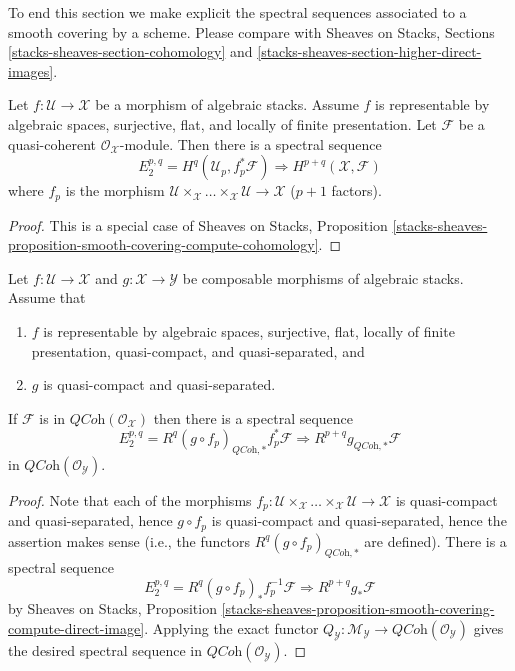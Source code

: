 \noindent
To end this section we make explicit the spectral sequences
associated to a smooth covering by a scheme. Please compare with
Sheaves on Stacks, Sections \ref{stacks-sheaves-section-cohomology} and
\ref{stacks-sheaves-section-higher-direct-images}.

\begin{proposition}
\label{proposition-smooth-covering-compute-cohomology}
Let $f : \mathcal{U} \to \mathcal{X}$ be a morphism of algebraic stacks.
Assume $f$ is representable by algebraic spaces, surjective, flat, and
locally of finite presentation. Let $\mathcal{F}$ be a quasi-coherent
$\mathcal{O}_\mathcal{X}$-module. Then there is a spectral sequence
$$
E_2^{p, q} = H^q(\mathcal{U}_p, f_p^*\mathcal{F})
\Rightarrow
H^{p + q}(\mathcal{X}, \mathcal{F})
$$
where $f_p$ is the morphism
$\mathcal{U} \times_\mathcal{X} \ldots \times_\mathcal{X} \mathcal{U} \to
\mathcal{X}$ ($p + 1$ factors).
\end{proposition}

\begin{proof}
This is a special case of
Sheaves on Stacks, Proposition
\ref{stacks-sheaves-proposition-smooth-covering-compute-cohomology}.
\end{proof}

\begin{proposition}
\label{proposition-smooth-covering-compute-direct-image}
Let $f : \mathcal{U} \to \mathcal{X}$ and $g : \mathcal{X} \to \mathcal{Y}$
be composable morphisms of algebraic stacks.
Assume that
\begin{enumerate}
\item $f$ is representable by algebraic spaces, surjective,
flat, locally of finite presentation, quasi-compact, and quasi-separated, and
\item $g$ is quasi-compact and quasi-separated.
\end{enumerate}
If $\mathcal{F}$ is in $\textit{QCoh}(\mathcal{O}_\mathcal{X})$ then
there is a spectral sequence
$$
E_2^{p, q} = R^q(g \circ f_p)_{\textit{QCoh}, *}f_p^*\mathcal{F}
\Rightarrow
R^{p + q}g_{\textit{QCoh}, *}\mathcal{F}
$$
in $\textit{QCoh}(\mathcal{O}_\mathcal{Y})$.
\end{proposition}

\begin{proof}
Note that each of the morphisms
$f_p : \mathcal{U} \times_\mathcal{X} \ldots \times_\mathcal{X} \mathcal{U} \to
\mathcal{X}$ is quasi-compact and quasi-separated, hence $g \circ f_p$
is quasi-compact and quasi-separated, hence the assertion makes sense
(i.e., the functors $R^q(g \circ f_p)_{\textit{QCoh}, *}$ are defined).
There is a spectral sequence
$$
E_2^{p, q} = R^q(g \circ f_p)_*f_p^{-1}\mathcal{F}
\Rightarrow
R^{p + q}g_*\mathcal{F}
$$
by Sheaves on Stacks, Proposition
\ref{stacks-sheaves-proposition-smooth-covering-compute-direct-image}.
Applying the exact functor
$Q_\mathcal{Y} : \mathcal{M}_\mathcal{Y} \to
\textit{QCoh}(\mathcal{O}_\mathcal{Y})$ gives the desired spectral sequence in
$\textit{QCoh}(\mathcal{O}_\mathcal{Y})$.
\end{proof}









